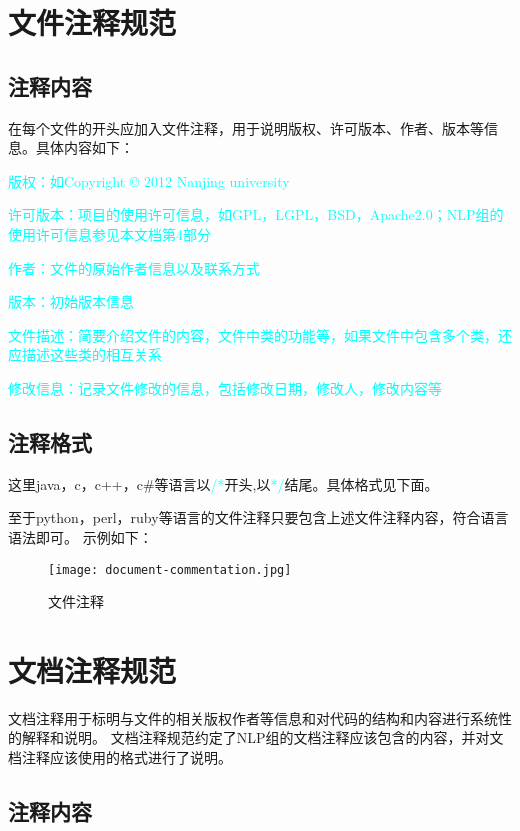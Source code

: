 \section{文件注释规范}

\subsection{注释内容}

在每个文件的开头应加入文件注释，用于说明版权、许可版本、作者、版本等信息。具体内容如下：

\textcolor{cyan}{版权：如Copyright © 2012 Nanjing university}

\textcolor{cyan}{许可版本：项目的使用许可信息，如GPL，LGPL，BSD，Apache2.0；NLP组的使用许可信息参见本文档第4部分}

\textcolor{cyan}{作者：文件的原始作者信息以及联系方式}

\textcolor{cyan}{版本：初始版本信息}

\textcolor{cyan}{文件描述：简要介绍文件的内容，文件中类的功能等，如果文件中包含多个类，还应描述这些类的相互关系}

\textcolor{cyan}{修改信息：记录文件修改的信息，包括修改日期，修改人，修改内容等}

\clearpage
\subsection{注释格式}

这里java，c，c++，c\#等语言以\textcolor{cyan}{/*}开头,以\textcolor{cyan}{*/}结尾。具体格式见下面。

至于python，perl，ruby等语言的文件注释只要包含上述文件注释内容，符合语言语法即可。
示例如下：
\begin{figure}[htpd]
 \centering
 \texttt{[image: document-commentation.jpg]}
 \caption{文件注释}
\end{figure}

\section{文档注释规范}

文档注释用于标明与文件的相关版权作者等信息和对代码的结构和内容进行系统性的解释和说明。
文档注释规范约定了NLP组的文档注释应该包含的内容，并对文档注释应该使用的格式进行了说明。

\subsection{注释内容}

